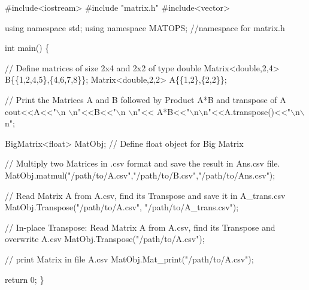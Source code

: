\begin{DoxyCode}
#include<iostream>
#include "matrix.h"
#include<vector>

using namespace std;
using namespace MATOPS; //namespace for matrix.h


int main() \{

        // Define matrices of size 2x4 and 2x2 of type double
        Matrix<double,2,4> B\{\{1,2,4,5\},\{4,6,7,8\}\}; 
        Matrix<double,2,2> A\{\{1,2\},\{2,2\}\};

        // Print the Matrices A and B followed by Product A*B and transpose of A
        cout<<A<<"\(\backslash\)n \(\backslash\)n"<<B<<"\(\backslash\)n \(\backslash\)n"<< A*B<<"\(\backslash\)n\(\backslash\)n"<<A.transpose()<<"\(\backslash\)n\(\backslash\)n";

        BigMatrix<float> MatObj; // Define float object for Big Matrix

        // Multiply two Matrices in .csv format and save the result in Ans.csv file.
        MatObj.matmul("/path/to/A.csv","/path/to/B.csv","/path/to/Ans.csv");

        // Read Matrix A from A.csv, find its Transpose and save it in A\_trans.csv
        MatObj.Transpose("/path/to/A.csv", "/path/to/A\_trans.csv");

        // In-place Transpose: Read Matrix A from A.csv, find its Transpose and overwrite A.csv
        MatObj.Transpose("/path/to/A.csv");

        // print Matrix in file A.csv
        MatObj.Mat\_print("/path/to/A.csv");

        return 0;
\}
\end{DoxyCode}
 